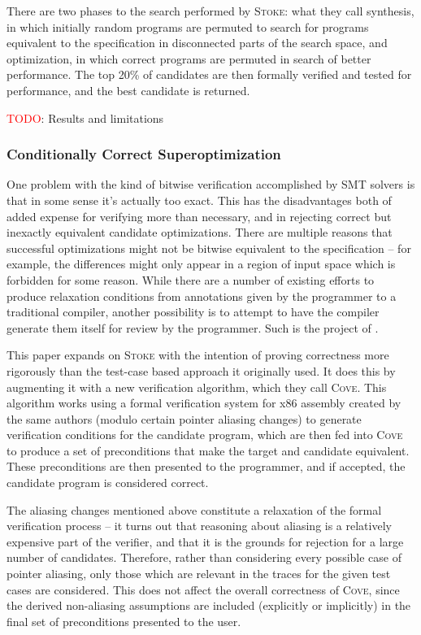 \documentclass[12pt,twoside]{reedthesis}
\newcommand{\red}[1]{\textcolor{red}{#1}}
\begin{document}
There are two phases to the search performed by \textsc{Stoke}:
    what they call synthesis, in which initially random programs are permuted to search for programs equivalent to the specification in disconnected parts of the search space,
    and optimization, in which correct programs are permuted in search of better performance.
The top 20\% of candidates are then formally verified and tested for performance, and the best candidate is returned.

\red{TODO}: Results and limitations

\subsubsection{Conditionally Correct Superoptimization}

One problem with the kind of bitwise verification accomplished by SMT solvers is that in some sense it's actually too exact.
This has the disadvantages both of added expense for verifying more than necessary, and in rejecting correct but inexactly equivalent candidate optimizations.
There are multiple reasons that successful optimizations might not be bitwise equivalent to the specification
    -- for example, the differences might only appear in a region of input space which is forbidden for some reason.
While there are a number of existing efforts to produce relaxation conditions from annotations given by the programmer to a traditional compiler, another possibility is to attempt to have the compiler generate them itself for review by the programmer.
Such is the project of \cite{sharma2015conditionally}.
    
This paper expands on \textsc{Stoke} with the intention of proving correctness more rigorously than the test-case based approach it originally used.
It does this by augmenting it with a new verification algorithm, which they call \textsc{Cove}.
This algorithm works using a formal verification system for x86 assembly created by the same authors \cite{sharma2013ddec} (modulo certain pointer aliasing changes) to generate verification conditions for the candidate program, which are then fed into \textsc{Cove} to produce a set of preconditions that make the target and candidate equivalent. These preconditions are then presented to the programmer, and if accepted, the candidate program is considered correct.
    
The aliasing changes mentioned above constitute a relaxation of the formal verification process -- it turns out that reasoning about aliasing is a relatively expensive part of the verifier, and that it is the grounds for rejection for a large number of candidates. Therefore, rather than considering every possible case of pointer aliasing, only those which are relevant in the traces for the given test cases are considered. This does not affect the overall correctness of \textsc{Cove}, since the derived non-aliasing assumptions are included (explicitly or implicitly) in the final set of preconditions presented to the user.
    
\end{document}
